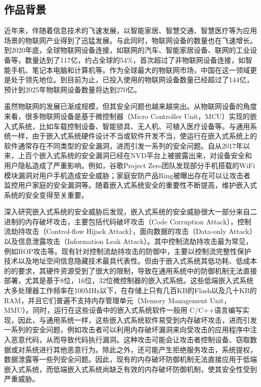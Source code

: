 \documentclass[12pt,a4paper]{ctexart}
\numberwithin{figure}{section}
\begin{document}
\subsection{作品背景}
\par 近年来，伴随着信息技术的飞速发展，以智能家居、智慧交通、智慧医疗等为应用场景的物联网产业得到了迅猛发展。与此同时，物联网设备的数量也在飞速增长。到2020年底，全球物联网设备连接，如联网的汽车、智能家居设备、联网的工业设备等，数量达到了117亿，约占全球的54\%，首次超过了非物联网设备连接，如智能手机、笔记本电脑和计算机等。作为全球最大的物联网市场，中国在这一领域更是处于领先地位。到目前为止，已投入使用的物联网设备数量已经超过了144亿，预计到2025年物联网设备数量将达到270亿。
\par 虽然物联网的发展已渐成规模，但其安全问题也越来越突出。从物联网设备的角度来看，很多物联网设备是基于微控制器（Micro Controller Unit，MCU）实现的嵌入式系统，比如车载控制设备、智能锁具、无人机、可植入医疗设备等。与通用系统一样，由于嵌入式系统硬件设计不当或软件开发不当，使运行在嵌入式系统上的软件通常存在不同类型的安全漏洞，进而引发一系列的安全问题。自从2017年以来，上百个嵌入式系统的安全漏洞已经在NVD平台上被披露出来，对设备安全和用户隐私造成了严重影响。例如，谷歌Project Zero团队发现部分手机搭载的WiFi模块漏洞对用户手机造成安全威胁；家庭安防产品Ring被曝出存在可以让攻击者监控用户家庭的安全漏洞等。随着嵌入式系统安全的重要性不断提高，维护嵌入式系统的安全变得至关重要。
\par 深入研究嵌入式系统的安全威胁后发现，嵌入式系统的安全威胁很大一部分来自二进制的内存破坏攻击，主要包括代码破坏攻击（Code Corruption Attack），控制流劫持攻击（Control-flow Hijack Attack），面向数据的攻击（Data-only Attack）以及信息泄露攻击（Information Leak Attack）。其中控制流劫持攻击最为常见，例如ROP攻击等。现有针对控制流劫持攻击的防御中，主要以控制流完整性保护技术以及地址空间信息隐藏技术最具代表性。但由于嵌入式系统其低功耗、低成本的的要求，其硬件资源受到了很大的限制，导致在通用系统中的防御机制无法直接部署，尤其是基于8位，16位，32位微控制器的嵌入式系统。这些低端嵌入式系统大多处理器工作频率在100MHz以下，在存储上只有几百KB的Flash以及几十KB的RAM，并且它们普遍不支持内存管理单元（Memory Management Unit，MMU）。同时，运行在这些设备中的嵌入式系统软件一般用 C/C++语言编写实现，因此，与通用系统一样，这些嵌入式系统软件易受到内存破坏攻击，进而引发一系列的安全问题，例如攻击者可以利用内存破坏漏洞来向受攻击的应用程序中注入恶意代码，从而导致代码执行漏洞。这种攻击可能会让攻击者控制设备、窃取数据或对系统进行其他恶意行为。除此之外，还可能产生拒绝服务攻击，系统提权，数据泄露等一些列安全问题。因此，现有的内存破坏防御机制无法直接应用于低端嵌入式系统，而低端嵌入式系统尚缺乏有效的内存破坏防御机制，使其安全性受到严重威胁。
\end{document}
